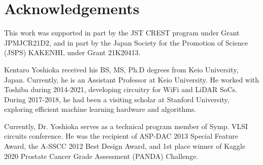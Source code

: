 \documentclass[paper]{ieice}
\begin{document}


\section*{Acknowledgements}
This work was supported in part by the JST CREST program under Grant JPMJCR21D2, and in part by the Japan Society for the Promotion of Science (JSPS) KAKENHI, under Grant 21K20413.





\begin{IEEEbiography}
{Kentaro Yoshioka}
received his BS, MS, Ph.D degrees from Keio University, Japan. Currently, he is an Assistant Professor at Keio University. He worked with Toshiba during 2014-2021, developing circuitry for WiFi and LiDAR SoCs. During 2017-2018, he had been a visiting scholar at Stanford University, exploring efficient machine learning hardware and algorithms. 

Currently, Dr. Yoshioka serves as a technical program member of Symp. VLSI circuits conference. He was the recipient of ASP-DAC 2013 Special Feature Award, the A-SSCC 2012 Best Design Award, and 1st place winner of Kaggle 2020 Prostate Cancer Grade Assessment (PANDA) Challenge.
\end{IEEEbiography}
\end{document}

